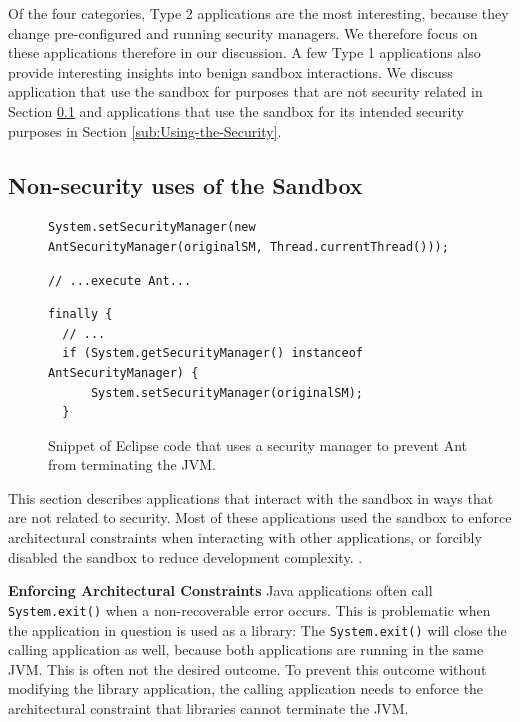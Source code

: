 \documentclass{sig-alternate}
\begin{document}
Of the four categories, Type 2 applications are the most interesting, because
they change pre-configured and running security managers.  We therefore focus
on these applications therefore in our discussion. A few Type 1
applications also provide interesting insights into
benign sandbox interactions. We discuss application that use the sandbox for
purposes that are not security related in Section \ref{sub:Non-security-uses-of}
and applications that use the sandbox for its intended security purposes in
Section \ref{sub:Using-the-Security}.

\subsection{Non-security uses of the Sandbox}\label{sub:Non-security-uses-of}

\begin{figure}
\begin{lstlisting}[firstnumber=691]
System.setSecurityManager(new AntSecurityManager(originalSM, Thread.currentThread()));
\end{lstlisting}
\vspace{-0.3cm}
\begin{lstlisting}[firstnumber=703]
// ...execute Ant...
\end{lstlisting}
\vspace{-0.3cm}
\begin{lstlisting}[firstnumber=723]
finally {
  // ...
  if (System.getSecurityManager() instanceof AntSecurityManager) { 
      System.setSecurityManager(originalSM); 
  }
\end{lstlisting}\vspace{-0.3cm}
\caption{Snippet of Eclipse code that uses a security manager to prevent Ant\label{fig:Eclipse-snippet}
from terminating the JVM.}
\end{figure}

This section describes applications that interact with the sandbox in ways that
are not related to security. Most of these applications used the
sandbox to enforce architectural constraints when interacting with
other applications, or forcibly disabled the sandbox to reduce development
complexity.  .

\noindent\textbf{Enforcing Architectural Constraints}
%
Java applications often call \texttt{System.exit()} when a non-recoverable
error occurs. This is problematic when the application in question is 
used as a library: The \texttt{System.exit()} will close the calling
application as well, because both applications
are running in the same JVM. This is often not the desired
outcome.
%
To prevent this outcome without modifying the library application,
the calling application needs to enforce the architectural constraint
that libraries cannot terminate the JVM. 
\end{document}
